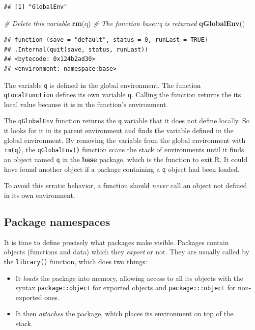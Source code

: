 \documentclass[
  12pt,
  american,
  a4paper,
  extrafontsizes,onecolumn,openright
  ]{memoir}
\newenvironment{Shaded}{\begin{snugshade}}{\end{snugshade}}
\newcommand{\CommentTok}[1]{\textcolor[rgb]{0.56,0.35,0.01}{\textit{#1}}}
\newcommand{\FunctionTok}[1]{\textcolor[rgb]{0.13,0.29,0.53}{\textbf{#1}}}
\newcommand{\NormalTok}[1]{#1}
\providecommand{\tightlist}{%
  \setlength{\itemsep}{0pt}\setlength{\parskip}{0pt}}
\begin{document}
\begin{verbatim}
## [1] "GlobalEnv"
\end{verbatim}

\begin{Shaded}
\begin{Highlighting}[]
\CommentTok{\# Delete this variable}
\FunctionTok{rm}\NormalTok{(q)}
\CommentTok{\# The function base::q is returned}
\FunctionTok{qGlobalEnv}\NormalTok{()}
\end{Highlighting}
\end{Shaded}

\begin{verbatim}
## function (save = "default", status = 0, runLast = TRUE) 
## .Internal(quit(save, status, runLast))
## <bytecode: 0x124b2ad30>
## <environment: namespace:base>
\end{verbatim}

\normalsize

The variable \texttt{q} is defined in the global environment.
The function \texttt{qLocalFunction} defines its own variable \texttt{q}.
Calling the function returns the its local value because it is in the function's environment.

The \texttt{qGlobalEnv} function returns the \texttt{q} variable that it does not define locally.
So it looks for it in its parent environment and finds the variable defined in the global environment.
By removing the variable from the global environment with \texttt{rm(q)}, the \texttt{qGlobalEnv()} function scans the stack of environments until it finds an object named \texttt{q} in the \textbf{base} package, which is the function to exit R.
It could have found another object if a package containing a \texttt{q} object had been loaded.

To avoid this erratic behavior, a function should \emph{never} call an object not defined in its own environment.

\subsection{Package namespaces}\label{package-namespaces}

It is time to define precisely what packages make visible.
Packages contain objects (functions and data) which they \emph{export} or not.
They are usually called by the \texttt{library()} function, which does two things:

\begin{itemize}
\tightlist
\item
  It \emph{loads} the package into memory, allowing access to all its objects with the syntax \texttt{package::object} for exported objects and \texttt{package:::object} for non-exported ones.
\item
  It then \emph{attaches} the package, which places its environment on top of the stack.
\end{itemize}
\end{document}
